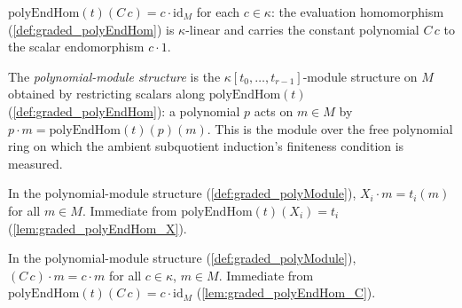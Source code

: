 \begin{lemma}\leanok
  \label{lem:graded_polyEndHom_C}
  \(\mathrm{polyEndHom}(t)(C\,c) = c \cdot \mathrm{id}_M\) for each \(c \in \kappa\):
  the evaluation homomorphism (\cref{def:graded_polyEndHom}) is \(\kappa\)-linear and
  carries the constant polynomial \(C\,c\) to the scalar endomorphism \(c \cdot 1\).
\end{lemma}

\begin{definition}\leanok
  \label{def:graded_polyModule}
  The \emph{polynomial-module structure} is the \(\kappa[t_0, \dots, t_{r-1}]\)-module
  structure on \(M\) obtained by restricting scalars along
  \(\mathrm{polyEndHom}(t)\) (\cref{def:graded_polyEndHom}): a polynomial \(p\) acts on
  \(m \in M\) by \(p \cdot m = \mathrm{polyEndHom}(t)(p)(m)\). This is the module over the
  free polynomial ring on which the ambient subquotient induction's finiteness condition
  is measured.
\end{definition}

\begin{lemma}[$X_i$ acts as $t_i$]\leanok
  \label{lem:graded_polyModule_X_smul}
  In the polynomial-module structure (\cref{def:graded_polyModule}), \(X_i \cdot m =
  t_i(m)\) for all \(m \in M\). Immediate from
  \(\mathrm{polyEndHom}(t)(X_i) = t_i\) (\cref{lem:graded_polyEndHom_X}).
\end{lemma}

\begin{lemma}\leanok
  \label{lem:graded_polyModule_C_smul}
  In the polynomial-module structure (\cref{def:graded_polyModule}), \((C\,c) \cdot m =
  c \cdot m\) for all \(c \in \kappa\), \(m \in M\). Immediate from
  \(\mathrm{polyEndHom}(t)(C\,c) = c \cdot \mathrm{id}_M\)
  (\cref{lem:graded_polyEndHom_C}).
\end{lemma}



